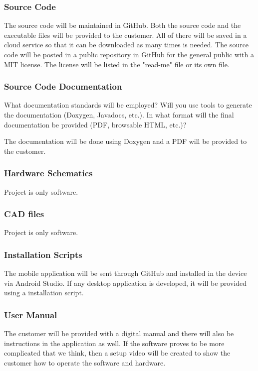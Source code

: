\subsubsection{Source Code}
The source code will be maintained in GitHub. Both the source code and the executable files will be provided to the customer. All of there will be saved in a cloud service so that it can be downloaded as many times is needed. The source code will be posted in a public repository in GitHub for the general public with a MIT license. The license will be listed in the "read-me" file or its own file.

\subsubsection{Source Code Documentation}
What documentation standards will be employed? Will you use tools to generate the documentation (Doxygen, Javadocs, etc.). In what format will the final documentation be provided (PDF, browsable HTML, etc.)?

The documentation will be done using Doxygen and a PDF will be provided to the customer.

\subsubsection{Hardware Schematics}
Project is only software.

\subsubsection{CAD files}
Project is only software.

\subsubsection{Installation Scripts}
The mobile application will be sent through GitHub and installed in the device via Android Studio. If any desktop application is developed, it will be provided using a installation script. 

\subsubsection{User Manual}
The customer will be provided with a digital manual and there will also be instructions in the application as well. If the software proves to be more complicated that we think, then a setup video will be created to show the customer how to operate the software and hardware.
